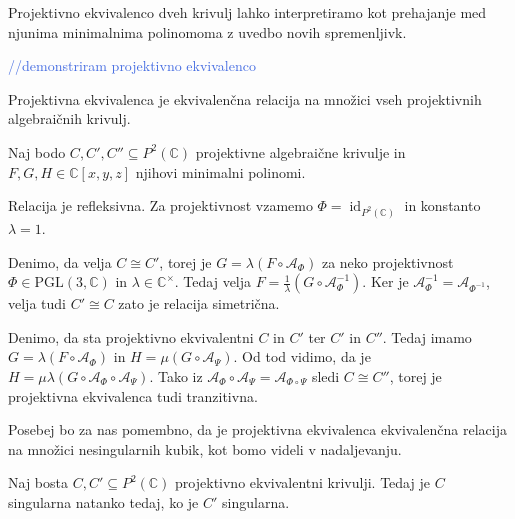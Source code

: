 \documentclass[mat1]{fmfdelo}
\newcommand{\C}{\mathbb C}
\newcommand{\CM}{\mathbb C ^\times}
\newcommand{\PC}{P^2(\mathbb C)}
\newcommand{\Cxyz}{\C[x,y,z]}
\newcommand{\inv}{^{-1}}
\newcommand{\kom}[1]{
    \textcolor{RoyalBlue}{//#1}
}
\DeclareMathOperator{\id}{id}
\theoremstyle{definition}
\begin{document}
Projektivno ekvivalenco dveh krivulj lahko interpretiramo kot prehajanje med njunima minimalnima polinomoma z uvedbo novih spremenljivk.

\begin{primer*}
    \kom{demonstriram projektivno ekvivalenco}
\end{primer*}

\begin{trditev}
    Projektivna ekvivalenca je ekvivalenčna relacija na množici vseh projektivnih algebraičnih krivulj.
\end{trditev}

\begin{dokaz}
    Naj bodo $C, C', C'' \subseteq \PC$ projektivne algebraične krivulje in $F, G, H \in \Cxyz$ njihovi minimalni polinomi. 
    \par Relacija je refleksivna. Za projektivnost vzamemo $\Phi = \id_{\PC}$ in konstanto $\lambda = 1$. 
    \par Denimo, da velja $C \cong C'$, torej je $G = \lambda (F \circ \mathcal{A}_\Phi)$ za neko projektivnost $\Phi \in \operatorname{PGL(3, \C)}$ in $\lambda \in \CM$. Tedaj velja $F = \frac{1}{\lambda} (G \circ \mathcal{A}_\Phi\inv)$. Ker je $\mathcal{A}_\Phi\inv = \mathcal{A}_{\Phi\inv}$, velja tudi $C' \cong C$ zato je relacija simetrična. 
    \par Denimo, da sta projektivno ekvivalentni $C$ in $C'$ ter $C'$ in $C''$. Tedaj imamo $G = \lambda (F \circ \mathcal{A}_\Phi)$ in $H = \mu (G \circ \mathcal{A}_\Psi)$. Od tod vidimo, da je $H = \mu\lambda(G \circ \mathcal{A}_\Phi \circ \mathcal{A}_\Psi)$. Tako iz $\mathcal{A}_\Phi \circ \mathcal{A}_\Psi = \mathcal{A}_{\Phi \circ \Psi}$ sledi $C \cong C''$, torej je projektivna ekvivalenca tudi tranzitivna. 
\end{dokaz}

Posebej bo za nas pomembno, da je projektivna ekvivalenca ekvivalenčna relacija na množici nesingularnih kubik, kot bomo videli v nadaljevanju. 

\begin{trditev}
    Naj bosta $C, C' \subseteq \PC$ projektivno ekvivalentni krivulji. Tedaj je $C$ singularna natanko tedaj, ko je $C'$ singularna. 
\end{trditev}
\end{document}
